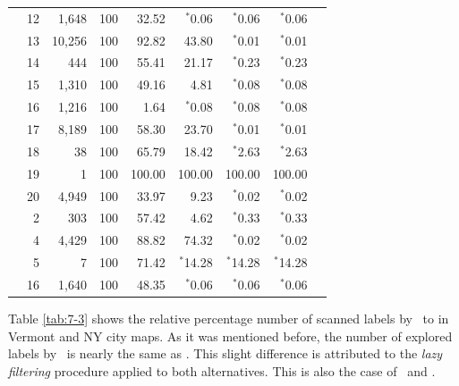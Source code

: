 \begin{table}
\begin{tabular}{crrrrrrrr}
& 12 & 1,648 & 100 & 32.52 & $^*$0.06 & $^*$0.06 & $^*$0.06 \\
& 13 & 10,256 & 100 & 92.82 & 43.80 & $^*$0.01 & $^*$0.01 \\
& 14 & 444 & 100 & 55.41 & 21.17 & $^*$0.23 & $^*$0.23 \\
& 15 & 1,310 & 100 & 49.16 & 4.81 & $^*$0.08 & $^*$0.08 \\
& 16 & 1,216 & 100 & 1.64 & $^*$0.08 & $^*$0.08 & $^*$0.08 \\
& 17 & 8,189 & 100 & 58.30 & 23.70 & $^*$0.01 & $^*$0.01 \\
& 18 & 38 & 100 & 65.79 & 18.42 & $^*$2.63 & $^*$2.63 \\
& 19 & 1 & 100 & 100.00 & 100.00 & 100.00 & 100.00 \\
& 20 & 4,949 & 100 & 33.97 & 9.23 & $^*$0.02 & $^*$0.02 \\
\noalign{\medskip}
\parbox[t]{2mm}{} & 2 & 303 & 100 & 57.42 & 4.62 & $^*$0.33 & $^*$0.33 \\
& 4 & 4,429 & 100 & 88.82 & 74.32 & $^*$0.02 & $^*$0.02 \\
& 5 & 7 & 100 & 71.42 & $^*$14.28 & $^*$14.28 & $^*$14.28 \\
& 16 & 1,640 & 100 & 48.35 & $^*$0.06 & $^*$0.06 & $^*$0.06 \\
\hline
\end{tabular}
\end{table}

Table \ref{tab:7-3} shows the relative percentage number of scanned labels by \lexgolin \ to \namoalin in Vermont and NY city maps. As it was mentioned before, the number of explored labels by \namoalin \ is nearly the same as \namoalex. This slight difference is attributed to the \emph{lazy filtering} procedure applied to both alternatives. This is also the case of \lexgolex \ and \lexgolin.


